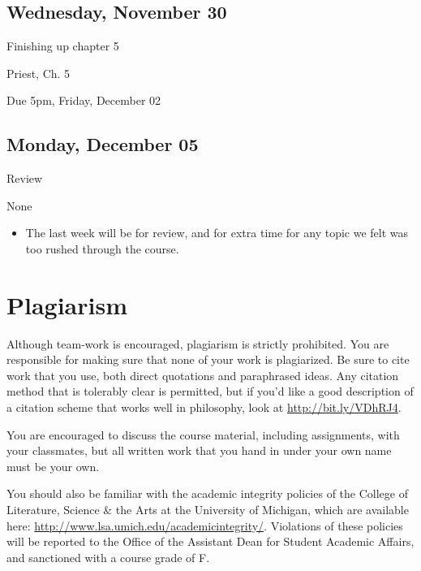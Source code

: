\documentclass[
]{article}
\providecommand{\tightlist}{%
  \setlength{\itemsep}{0pt}\setlength{\parskip}{0pt}}\usepackage{longtable,booktabs,array}
\begin{document}
\hypertarget{wednesday-november-30}{%
\subsection{Wednesday, November 30}\label{wednesday-november-30}}

\begin{description}
\tightlist
\item[Topic]
Finishing up chapter 5
\item[Required Reading]
Priest, Ch. 5
\item[Weekly Quiz]
Due 5pm, Friday, December 02
\end{description}

\hypertarget{monday-december-05}{%
\subsection{Monday, December 05}\label{monday-december-05}}

\begin{description}
\tightlist
\item[Topic]
Review
\item[Required Reading]
None
\end{description}

\begin{itemize}
\tightlist
\item
  The last week will be for review, and for extra time for any topic we
  felt was too rushed through the course.
\end{itemize}

\hypertarget{plagiarism}{%
\section{Plagiarism}\label{plagiarism}}

Although team-work is encouraged, plagiarism is strictly prohibited. You
are responsible for making sure that none of your work is plagiarized.
Be sure to cite work that you use, both direct quotations and
paraphrased ideas. Any citation method that is tolerably clear is
permitted, but if you'd like a good description of a citation scheme
that works well in philosophy, look at \url{http://bit.ly/VDhRJ4}.

You are encouraged to discuss the course material, including
assignments, with your classmates, but all written work that you hand in
under your own name must be your own.

You should also be familiar with the academic integrity policies of the
College of Literature, Science \& the Arts at the University of
Michigan, which are available here:
\url{http://www.lsa.umich.edu/academicintegrity/}. Violations of these
policies will be reported to the Office of the Assistant Dean for
Student Academic Affairs, and sanctioned with a course grade of F.
\end{document}
